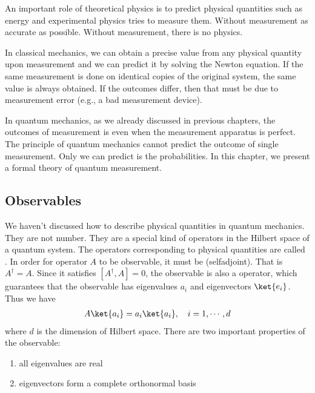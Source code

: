 \documentclass[letterpaper,10pt,english]{jupyterBook}
\begin{document}
\sphinxAtStartPar
An important role of theoretical physics is to predict physical quantities such as energy and experimental physics tries to measure them.  Without measurement as accurate as possible.  Without measurement, there is no physics.

\sphinxAtStartPar
In classical mechanics, we can obtain a precise value from any  physical quantity  upon measurement and we can predict it by solving the Newton equation.  If the same measurement is done on identical copies of the original system, the same value is always obtained. If the outcomes differ, then that must be due to measurement error (e.g., a bad measurement device).

\sphinxAtStartPar
In quantum mechanics, as we already discussed in previous chapters, the outcomes of measurement is  even when the measurement apparatus is perfect. The principle of quantum mechanics cannot predict the outcome of single measurement. Only we can predict is the probabilities.   In this chapter, we present a formal theory of quantum measurement.


\subsection{Observables}
\label{\detokenize{qmsummary/measurement:observables}}
\sphinxAtStartPar
{}

\sphinxAtStartPar
We haven’t discussed how to describe physical quantities in quantum mechanics.  They are not number.  They are a special kind of operators in the Hilbert space of a quantum system. The operators corresponding to physical quantities are called .
In order for operator \(A\) to be observable, it must be  (self\sphinxhyphen{}adjoint).  That is \(A^\dagger = A\).  Since it satisfies \([A^\dagger, A]=0\), the observable is also a  operator,  which guarantees that the observable has eigenvalues \(a_i\) and eigenvectors \(\ket{e_i}\).  Thus we have
\begin{equation*}
\begin{split}
A \ket{a_i} = a_i \ket{a_i}, \quad i=1,\cdots,d
\end{split}
\end{equation*}
\sphinxAtStartPar
where \(d\) is the dimension of Hilbert space.  There are two important properties of the observable:
\begin{enumerate}
%
\item {}
\sphinxAtStartPar
all eigenvalues are real

\item {}
\sphinxAtStartPar
eigenvectors form a complete orthonormal basis

\end{enumerate}
\end{document}
